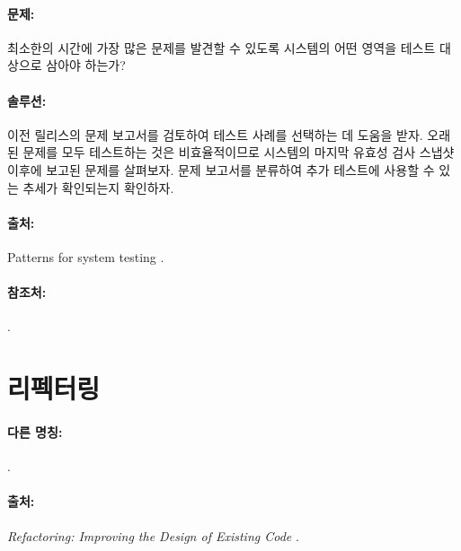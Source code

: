 \documentclass[a4paper,10pt,twoside]{book}
\begin{document}

\paragraph*{문제:}
최소한의 시간에 가장 많은 문제를 발견할 수 있도록 시스템의 어떤 영역을 테스트 대상으로 삼아야 하는가?

\paragraph*{솔루션:}
이전 릴리스의 문제 보고서를 검토하여 테스트 사례를 선택하는 데 도움을 받자. 오래된 문제를 모두 테스트하는 것은 비효율적이므로 시스템의 마지막 유효성 검사 스냅샷 이후에 보고된 문제를 살펴보자. 문제 보고서를 분류하여 추가 테스트에 사용할 수 있는 추세가 확인되는지 확인하자.

\paragraph*{출처:}
Patterns for system testing \cite{DeLa98a}.

\paragraph*{참조처:}
.

\section{리펙터링}


\paragraph*{다른 명칭:}
 \cite{Robe99a}.


\paragraph*{출처:}
\emph{Refactoring: Improving the Design of Existing Code} \cite{Fowl99a}.
\end{document}
